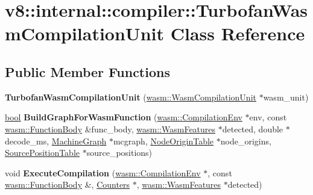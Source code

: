 \hypertarget{classv8_1_1internal_1_1compiler_1_1TurbofanWasmCompilationUnit}{}\section{v8\+:\+:internal\+:\+:compiler\+:\+:Turbofan\+Wasm\+Compilation\+Unit Class Reference}
\label{classv8_1_1internal_1_1compiler_1_1TurbofanWasmCompilationUnit}
\subsection*{Public Member Functions}
\begin{DoxyCompactItemize}
\item 
\mbox{\label{classv8_1_1internal_1_1compiler_1_1TurbofanWasmCompilationUnit_a42041b0604b3cce3adddc865d9b51683}} 
{\bfseries Turbofan\+Wasm\+Compilation\+Unit} (\mbox{\hyperlink{classv8_1_1internal_1_1wasm_1_1WasmCompilationUnit}{wasm\+::\+Wasm\+Compilation\+Unit}} $\ast$wasm\+\_\+unit)
\item 
\mbox{\label{classv8_1_1internal_1_1compiler_1_1TurbofanWasmCompilationUnit_acbd5b1f60b98bee29db507ac6ee128e6}} 
\mbox{\hyperlink{classbool}{bool}} {\bfseries Build\+Graph\+For\+Wasm\+Function} (\mbox{\hyperlink{structv8_1_1internal_1_1wasm_1_1CompilationEnv}{wasm\+::\+Compilation\+Env}} $\ast$env, const \mbox{\hyperlink{structv8_1_1internal_1_1wasm_1_1FunctionBody}{wasm\+::\+Function\+Body}} \&func\+\_\+body, \mbox{\hyperlink{structv8_1_1internal_1_1wasm_1_1WasmFeatures}{wasm\+::\+Wasm\+Features}} $\ast$detected, double $\ast$decode\+\_\+ms, \mbox{\hyperlink{classv8_1_1internal_1_1compiler_1_1MachineGraph}{Machine\+Graph}} $\ast$mcgraph, \mbox{\hyperlink{classv8_1_1internal_1_1compiler_1_1NodeOriginTable}{Node\+Origin\+Table}} $\ast$node\+\_\+origins, \mbox{\hyperlink{classv8_1_1internal_1_1compiler_1_1SourcePositionTable}{Source\+Position\+Table}} $\ast$source\+\_\+positions)
\item 
\mbox{\label{classv8_1_1internal_1_1compiler_1_1TurbofanWasmCompilationUnit_ae04cb93ea63f03e0d47c21ec5d21d608}} 
void {\bfseries Execute\+Compilation} (\mbox{\hyperlink{structv8_1_1internal_1_1wasm_1_1CompilationEnv}{wasm\+::\+Compilation\+Env}} $\ast$, const \mbox{\hyperlink{structv8_1_1internal_1_1wasm_1_1FunctionBody}{wasm\+::\+Function\+Body}} \&, \mbox{\hyperlink{classv8_1_1internal_1_1Counters}{Counters}} $\ast$, \mbox{\hyperlink{structv8_1_1internal_1_1wasm_1_1WasmFeatures}{wasm\+::\+Wasm\+Features}} $\ast$detected)
\end{DoxyCompactItemize}


